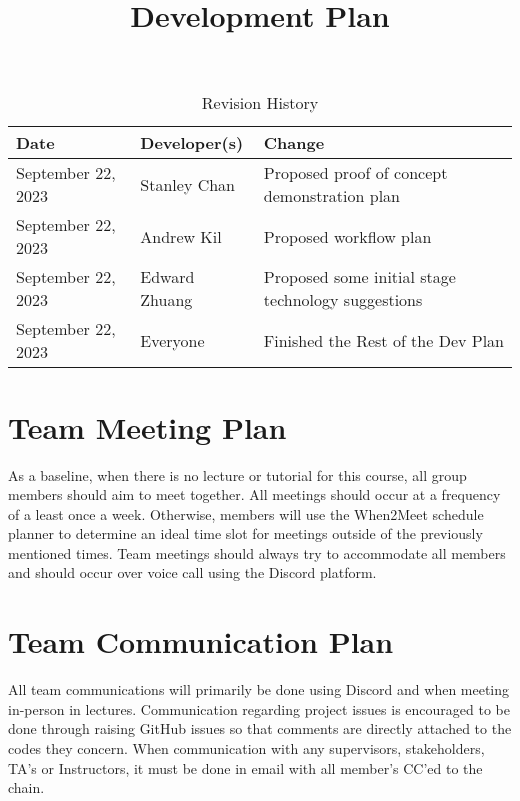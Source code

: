 \documentclass{article}
\title{Development Plan\\\progname}
\author{\authname}
\date{}
\begin{document}
\maketitle

\begin{table}[hp]
\caption{Revision History} \label{TblRevisionHistory}
\begin{tabularx}{\textwidth}{llX}
\toprule
\textbf{Date} & \textbf{Developer(s)} & \textbf{Change}\\
\midrule
September 22, 2023 & Stanley Chan & Proposed proof of concept demonstration plan\\
September 22, 2023 & Andrew Kil & Proposed workflow plan\\
September 22, 2023 & Edward Zhuang & Proposed some initial stage technology suggestions\\
September 22, 2023 & Everyone & Finished the Rest of the Dev Plan\\
\bottomrule
\end{tabularx}
\end{table}


\section{Team Meeting Plan}

As a baseline, when there is no lecture or tutorial for this course, all group members should aim to meet together. All meetings should occur at a frequency of a least once a week. Otherwise, members will use the When2Meet schedule planner to determine an ideal time slot for meetings outside of the previously mentioned times. Team meetings should always try to accommodate all members and should occur over voice call using the Discord platform.

\section{Team Communication Plan}

All team communications will primarily be done using Discord and when meeting in-person in lectures. Communication regarding project issues is encouraged to be done through raising GitHub issues so that comments are directly attached to the codes they concern. When communication with any supervisors, stakeholders, TA's or Instructors, it must be done in email with all member's CC'ed to the chain.
\end{document}
